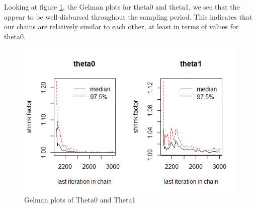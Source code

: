 Looking at figure \ref{fig:gelman-theta0}, the Gelman plots for theta0 and theta1, we see that the appear to be well-disbursed throughout the sampling period. This indicates that our chains are relatively similar to each other, at least in terms of values for theta0.

\begin{figure}[!h]
    \centering
    \includegraphics[scale = 0.65]{theta0_gelman.png}
    \caption{Gelman plots of Theta0 and Theta1}
    \label{fig:gelman-theta0}
\end{figure}